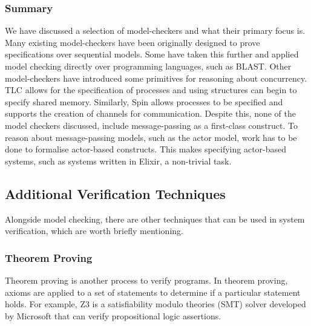 \subsubsection{Summary}
We have discussed a selection of model-checkers and what their primary focus is. Many existing model-checkers have been originally designed to prove specifications over sequential models. Some have taken this further and applied model checking directly over programming languages, such as BLAST. Other model-checkers have introduced some primitives for reasoning about concurrency. TLC allows for the specification of processes and using structures can begin to specify shared memory. Similarly, Spin allows processes to be specified and supports the creation of channels for communication. Despite this, none of the model checkers discussed, include message-passing as a first-class construct. To reason about message-passing models, such as the actor model, work has to be done to formalise actor-based constructs. This makes specifying actor-based systems, such as systems written in Elixir, a non-trivial task.
\subsection{Additional Verification Techniques}
Alongside model checking, there are other techniques that can be used in system verification, which are worth briefly mentioning. 
\subsubsection{Theorem Proving}
Theorem proving is another process to verify programs. In theorem proving, axioms are applied to a set of statements to determine if a particular statement holds. For example, Z3 \cite{z3} is a satisfiability modulo theories (SMT) solver developed by Microsoft that can verify propositional logic assertions.
